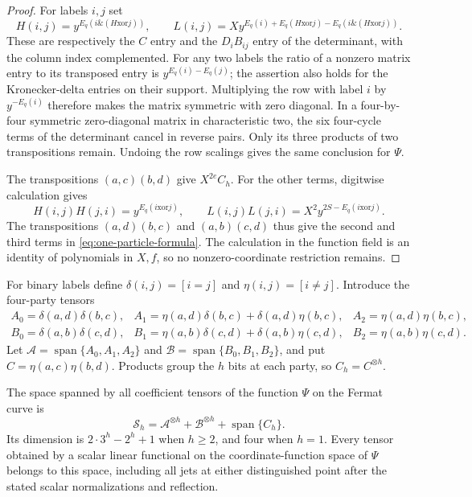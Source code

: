 \begin{proof}
For labels $i,j$ set
\[
 H(i,j)=y^{E_q(i\mathbin{\&}(H\mathbin{\mathrm{xor}}j))},
 \qquad
 L(i,j)=Xy^{E_q(i)+E_q(H\mathbin{\mathrm{xor}}j)-
                   E_q(i\mathbin{\&}(H\mathbin{\mathrm{xor}}j))}.
\]
These are respectively the $C$ entry and the $D_iB_{ij}$ entry
of the determinant, with the column index complemented.
For any two labels the ratio of a nonzero matrix entry to its
transposed entry is $y^{E_q(i)-E_q(j)}$; the assertion also holds
for the Kronecker-delta entries on their support.
Multiplying the row with label $i$ by $y^{-E_q(i)}$ therefore
makes the matrix symmetric with zero diagonal.
In a four-by-four symmetric zero-diagonal matrix in characteristic
two, the six four-cycle terms of the determinant cancel in reverse
pairs. Only its three products of two transpositions remain.
Undoing the row scalings gives the same conclusion for $\Psi$.

The transpositions $(a,c)(b,d)$ give $X^{2e}C_h$.
For the other terms, digitwise calculation gives
\[
 H(i,j)H(j,i)=y^{E_q(i\mathbin{\mathrm{xor}}j)},\qquad
 L(i,j)L(j,i)=X^2y^{2S-E_q(i\mathbin{\mathrm{xor}}j)}.
\]
The transpositions $(a,d)(b,c)$ and $(a,b)(c,d)$ thus give the
second and third terms in \eqref{eq:one-particle-formula}.
The calculation in the function field is an identity of polynomials
in $X,f$, so no nonzero-coordinate restriction remains.
\end{proof}

For binary labels define $\delta(i,j)=[i=j]$ and
$\eta(i,j)=[i\ne j]$. Introduce the four-party tensors
\[
\begin{array}{lll}
 A_0=\delta(a,d)\delta(b,c),&
 A_1=\eta(a,d)\delta(b,c)+\delta(a,d)\eta(b,c),&
 A_2=\eta(a,d)\eta(b,c),\\
 B_0=\delta(a,b)\delta(c,d),&
 B_1=\eta(a,b)\delta(c,d)+\delta(a,b)\eta(c,d),&
 B_2=\eta(a,b)\eta(c,d).
\end{array}
\]
Let $\mathcal A=\operatorname{span}\{A_0,A_1,A_2\}$ and
$\mathcal B=\operatorname{span}\{B_0,B_1,B_2\}$, and put
$C=\eta(a,c)\eta(b,d)$. Products group the $h$ bits at each party,
so $C_h=C^{\otimes h}$.

\begin{proposition}
\label{prop:one-particle-span}
The space spanned by all coefficient tensors of the function $\Psi$
on the Fermat curve is
\[
 \mathcal S_h=\mathcal A^{\otimes h}+
                  \mathcal B^{\otimes h}+\operatorname{span}\{C_h\}.
\]
Its dimension is $2\cdot3^h-2^h+1$ when $h\ge2$, and four when
$h=1$. Every tensor obtained by a scalar linear functional on the
coordinate-function space of $\Psi$ belongs to this space, including
all jets at either distinguished point after the stated scalar
normalizations and reflection.
\end{proposition}

